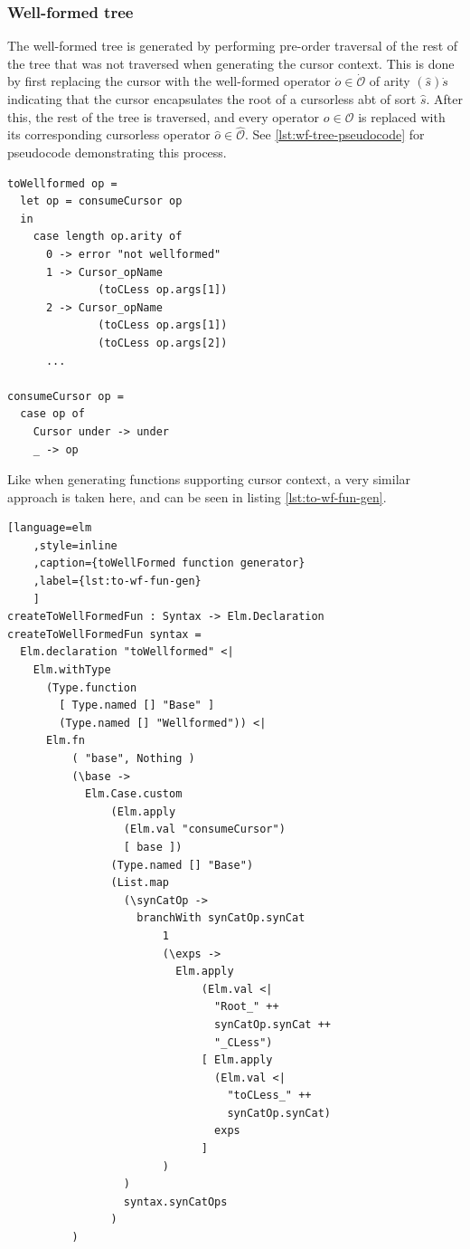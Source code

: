 \subsubsection{Well-formed tree}

The well-formed tree is generated by performing pre-order traversal of the
rest of the tree that was not traversed when generating the cursor context.
This is done by first replacing the cursor with the well-formed operator
$\dot{o} \in \dot{\mathcal{O}}$ of arity $(\hat{s})\dot{s}$ indicating that the
cursor encapsulates the root of a cursorless abt of sort $\hat{s}$.
After this, the rest of the tree is traversed, and every operator $o \in \mathcal{O}$
is replaced with its corresponding cursorless operator $\hat{o} \in \hat{\mathcal{O}}$.
See \cref{lst:wf-tree-pseudocode} for pseudocode demonstrating this process.

\begin{lstlisting}[caption={Pseudocode for generating well-formed tree},label={lst:wf-tree-pseudocode}, style=inline]
toWellformed op =
  let op = consumeCursor op
  in
    case length op.arity of
      0 -> error "not wellformed"
      1 -> Cursor_opName
              (toCLess op.args[1])
      2 -> Cursor_opName
              (toCLess op.args[1])
              (toCLess op.args[2])
      ...

consumeCursor op =
  case op of
    Cursor under -> under
    _ -> op
\end{lstlisting}



Like when generating functions supporting cursor context, a very similar approach
is taken here, and can be seen in listing \cref{lst:to-wf-fun-gen}.

\begin{lstlisting}[language=elm
    ,style=inline
    ,caption={toWellFormed function generator}
    ,label={lst:to-wf-fun-gen}
    ]
createToWellFormedFun : Syntax -> Elm.Declaration
createToWellFormedFun syntax =
  Elm.declaration "toWellformed" <|
    Elm.withType 
      (Type.function 
        [ Type.named [] "Base" ] 
        (Type.named [] "Wellformed")) <|
      Elm.fn
          ( "base", Nothing )
          (\base ->
            Elm.Case.custom
                (Elm.apply 
                  (Elm.val "consumeCursor") 
                  [ base ])
                (Type.named [] "Base")
                (List.map
                  (\synCatOp ->
                    branchWith synCatOp.synCat
                        1
                        (\exps ->
                          Elm.apply
                              (Elm.val <| 
                                "Root_" ++ 
                                synCatOp.synCat ++ 
                                "_CLess")
                              [ Elm.apply 
                                (Elm.val <| 
                                  "toCLess_" ++ 
                                  synCatOp.synCat) 
                                exps 
                              ]
                        )
                  )
                  syntax.synCatOps
                )
          )
\end{lstlisting}

